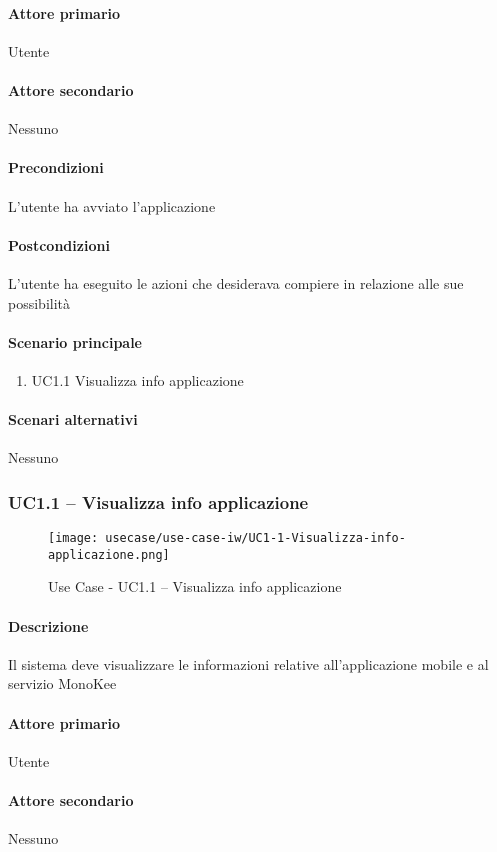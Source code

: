 \paragraph{Attore primario}  Utente
\paragraph{Attore secondario}  Nessuno
\paragraph{Precondizioni}  L’utente ha avviato l’applicazione
\paragraph{Postcondizioni}  L’utente ha eseguito le azioni che desiderava compiere in relazione alle sue possibilità
\paragraph{Scenario principale}  
    \begin{enumerate}
        \item UC1.1 Visualizza info applicazione
    \end{enumerate}
\paragraph{Scenari alternativi}  Nessuno


\subsubsection{UC1.1 – Visualizza info applicazione}
\begin{figure}[!htbp] 
    \centering 
    \texttt{[image: usecase/use-case-iw/UC1-1-Visualizza-info-applicazione.png]} 
    \caption{Use Case - UC1.1 – Visualizza info applicazione}
\end{figure}

\paragraph{Descrizione}  Il sistema deve visualizzare le informazioni relative all’applicazione mobile e al servizio MonoKee  
\paragraph{Attore primario}  Utente
\paragraph{Attore secondario}  Nessuno
